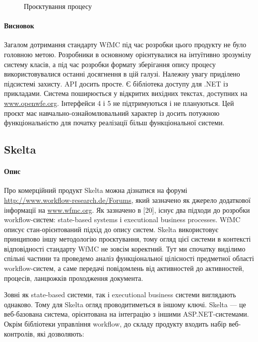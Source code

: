 \documentclass{memoir}
\begin{document}
\begin{figure}[h]
    \centering
    \caption{Проєктування процесу}
    \label{fig:openwfe_process_design}
\end{figure}

\paragraph{Висновок}

Загалом дотримання стандарту WfMC під час розробки цього продукту не було головною метою. Розробники в основному орієнтувалися на інтуїтивно зрозумілу систему класів, а під час розробки формату зберігання опису процесу використовувалися останні досягнення в цій галузі. Належну увагу приділено підсистемі захисту. API досить просте. Є бібліотека доступу для .NET із прикладами. Система поширюється у відкритих вихідних текстах, доступних на \url{www.openwfe.org}. Інтерфейси 4 і 5 не підтримуються і не плануються. Цей проєкт має навчально-ознайомлювальний характер із досить потужною функціональністю для початку реалізації більш функціональної системи.

\subsection{Skelta}

\paragraph{Опис}

Про комерційний продукт Skelta можна дізнатися на форумі \url{http://www.workflow-research.de/Forums}, який зазначено як джерело додаткової інформації на \url{www.wfmc.org}. Як зазначено в [20], існує два підходи до розробки workflow-систем: state-based systems і executional business processes. WfMC описує стан-орієнтований підхід до опису систем. Skelta використовує принципово іншу методологію проєктування, тому огляд цієї системи в контексті відповідності стандарту WfMC не зовсім коректний. Тут ми спочатку виділимо спільні частини та проведемо аналіз функціональної цілісності предметної області workflow-систем, а саме передачі повідомлень від активностей до активностей, процесів, ланцюжків проходження документа.

Зовні як state-based системи, так і executional business системи виглядають однаково. Тому для Skelta огляд проводитиметься в іншому ключі. Skelta — це веб-базована система, орієнтована на інтеграцію з іншими ASP.NET-системами. Окрім бібліотеки управління workflow, до складу продукту входить набір веб-контролів, які дозволяють:
\end{document}
